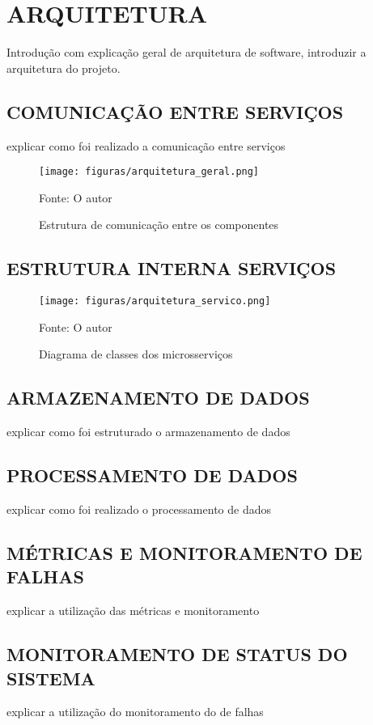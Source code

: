 \chapter{ARQUITETURA}
\label{chp:arquitetura}

Introdução com explicação geral de arquitetura de software, introduzir a
arquitetura do projeto.

\section{COMUNICAÇÃO ENTRE SERVIÇOS}

explicar como foi realizado a comunicação entre serviços

\begin{figure}[H]
	\centering
	\caption{Estrutura de comunicação entre os componentes}
	\texttt{[image: figuras/arquitetura\_geral.png]}

	\label{fig:arch-geral}
	\footnotesize Fonte: O autor
\end{figure}

\section{ESTRUTURA INTERNA SERVIÇOS}

\begin{figure}[H]
	\centering
	\caption{Diagrama de classes dos microsserviços}
	\texttt{[image: figuras/arquitetura\_servico.png]}

	\label{fig:arch-servico}
	\footnotesize Fonte: O autor
\end{figure}

\section{ARMAZENAMENTO DE DADOS}

explicar como foi estruturado o armazenamento de dados

\section{PROCESSAMENTO DE DADOS}

explicar como foi realizado o processamento de dados

\section{MÉTRICAS E MONITORAMENTO DE FALHAS}

explicar a utilização das métricas e monitoramento

\section{MONITORAMENTO DE STATUS DO SISTEMA}

explicar a utilização do monitoramento do de falhas
